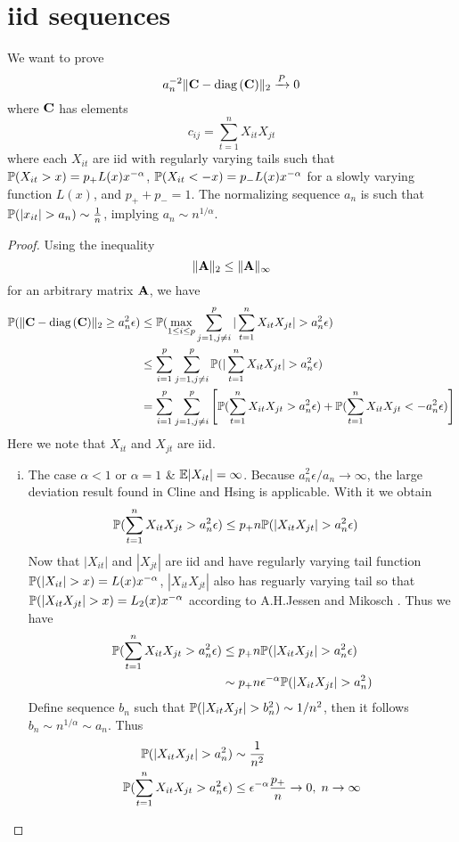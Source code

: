 \documentclass{article}
\begin{document}
\section{iid sequences}
We want to prove
\[
a_n^{-2}\|\mathbf{C} - \text{diag\,}(\mathbf{C})\|_2 \xrightarrow{P} 0
\]
where $\mathbf{C}$ has elements
\[
c_{ij} = \sum_{t=1}^n X_{it} X_{jt}
\]
where each $X_{it}$ are iid with regularly varying tails such that
$\mathbb{P}(X_{it} > x) = p_+ L(x) x^{-\alpha}$, $\mathbb{P}(X_{it} < -x) = p_- L(x) x^{-\alpha}$
for a slowly varying function $L(x)$, and $p_+ + p_- = 1$. The
normalizing sequence $a_n$ is such that $\mathbb{P}(|x_{it}| > a_n) \sim {1
  \over n}$, implying $a_n \sim n^{1/\alpha}$.
\begin{proof}
  Using the inequality
  \[
  \|\mathbf{A}\|_2 \leq \|\mathbf{A}\|_\infty
  \]
  for an arbitrary matrix $\mathbf{A}$, we have
  \begin{align*}
  \mathbb{P}(\|\mathbf{C} - \text{diag\,}(\mathbf{C})\|_2 \geq a_n^2 \epsilon) & \leq
  \mathbb{P}(\max_{1\leq i \leq p} \sum_{j=1, j\neq i}^p |\sum_{t=1}^n
  X_{it} X_{jt}| > a_n^2 \epsilon) \\
  &\leq \sum_{i=1}^p \sum_{j=1, j\neq i}^p \mathbb{P}(|\sum_{t=1}^n
  X_{it} X_{jt}| > a_n^2 \epsilon) \\
  &= \sum_{i=1}^p \sum_{j=1, j\neq i}^p \left[\mathbb{P}(\sum_{t=1}^n
    X_{it} X_{jt} > a_n^2 \epsilon) + \mathbb{P}(\sum_{t=1}^n
    X_{it} X_{jt} < -a_n^2 \epsilon) \right]\\
  \end{align*}
  Here we note that $X_{it}$ and $X_{jt}$ are iid.
  \begin{enumerate}[i)]
  \item The case $\alpha < 1$ or $\alpha = 1$ \& $\mathbb{E}|X_{it}| =
    \infty$. Because $a_n^2 \epsilon / a_n \to \infty$, the large
    deviation result found in Cline and Hsing \cite{ClingHsing1998} is
    applicable. With it we obtain
    \begin{align*}
      \mathbb{P}(\sum_{t=1}^n X_{it} X_{jt} > a_n^2 \epsilon) &\leq
      p_+ n \mathbb{P}(|X_{it} X_{jt}| > a_n^2 \epsilon)
    \end{align*}
    Now that $|X_{it}|$ and $|X_{jt}|$ are iid and have regularly
    varying tail function $\mathbb{P}(|X_{it}| > x) = L(x)x^{-\alpha}$,
    $|X_{it} X_{jt}|$ also has reguarly varying tail so that
    $\mathbb{P}(|X_{it} X_{jt}| > x) = L_2(x) x^{-\alpha}$ according to
    A.H.Jessen and Mikosch \cite{JessenMikosch2006}. Thus we have
    \begin{align*}
      \mathbb{P}(\sum_{t=1}^n X_{it} X_{jt} > a_n^2 \epsilon) &\leq
      p_+ n \mathbb{P}(|X_{it} X_{jt}| > a_n^2 \epsilon) \\
      &\sim p_+ n  \epsilon^{-\alpha} \mathbb{P}(|X_{it} X_{jt}| > a_n^2) \\
    \end{align*}
    Define sequence $b_n$ such that $\mathbb{P}(|X_{it} X_{jt}| > b_n^2) \sim
    1/n^2$, then it follows $b_n \sim n^{1/\alpha} \sim a_n$. Thus
    \begin{align*}
      \mathbb{P}(|X_{it} X_{jt}| > a_n^2) &\sim {1 \over n^2} \\
      \mathbb{P}(\sum_{t=1}^n X_{it} X_{jt} > a_n^2 \epsilon) &\leq
      \epsilon^{-\alpha} {p_+ \over n} \to 0,\; n \to \infty
    \end{align*}


\end{enumerate}
\end{proof}
\end{document}

